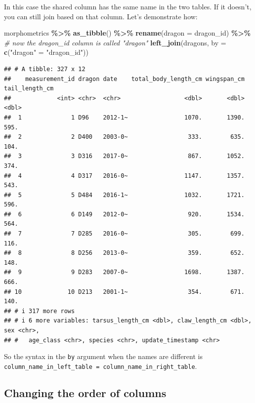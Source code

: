 \documentclass[
]{book}
\newenvironment{Shaded}{\begin{snugshade}}{\end{snugshade}}
\newcommand{\AttributeTok}[1]{\textcolor[rgb]{0.13,0.29,0.53}{#1}}
\newcommand{\CommentTok}[1]{\textcolor[rgb]{0.56,0.35,0.01}{\textit{#1}}}
\newcommand{\FunctionTok}[1]{\textcolor[rgb]{0.13,0.29,0.53}{\textbf{#1}}}
\newcommand{\NormalTok}[1]{#1}
\newcommand{\OtherTok}[1]{\textcolor[rgb]{0.56,0.35,0.01}{#1}}
\newcommand{\SpecialCharTok}[1]{\textcolor[rgb]{0.81,0.36,0.00}{\textbf{#1}}}
\newcommand{\StringTok}[1]{\textcolor[rgb]{0.31,0.60,0.02}{#1}}
\begin{document}
In this case the shared column has the same name in the two tables. If it
doesn't, you can still join based on that column. Let's demonstrate how:

\begin{Shaded}
\begin{Highlighting}[]
\NormalTok{morphometrics }\SpecialCharTok{\%\textgreater{}\%} 
  \FunctionTok{as\_tibble}\NormalTok{() }\SpecialCharTok{\%\textgreater{}\%} 
  \FunctionTok{rename}\NormalTok{(}\AttributeTok{dragon =}\NormalTok{ dragon\_id) }\SpecialCharTok{\%\textgreater{}\%} \CommentTok{\# now the dragon\_id column is called "dragon"}
  \FunctionTok{left\_join}\NormalTok{(dragons, }\AttributeTok{by =} \FunctionTok{c}\NormalTok{(}\StringTok{"dragon"} \OtherTok{=} \StringTok{"dragon\_id"}\NormalTok{)) }
\end{Highlighting}
\end{Shaded}

\begin{verbatim}
## # A tibble: 327 x 12
##    measurement_id dragon date    total_body_length_cm wingspan_cm tail_length_cm
##             <int> <chr>  <chr>                  <dbl>       <dbl>          <dbl>
##  1              1 D96    2012-1~                1070.       1390.           595.
##  2              2 D400   2003-0~                 333.        635.           104.
##  3              3 D316   2017-0~                 867.       1052.           374.
##  4              4 D317   2016-0~                1147.       1357.           543.
##  5              5 D484   2016-1~                1032.       1721.           596.
##  6              6 D149   2012-0~                 920.       1534.           564.
##  7              7 D285   2016-0~                 305.        699.           116.
##  8              8 D256   2013-0~                 359.        652.           148.
##  9              9 D283   2007-0~                1698.       1387.           666.
## 10             10 D213   2001-1~                 354.        671.           140.
## # i 317 more rows
## # i 6 more variables: tarsus_length_cm <dbl>, claw_length_cm <dbl>, sex <chr>,
## #   age_class <chr>, species <chr>, update_timestamp <chr>
\end{verbatim}

So the syntax in the \texttt{by} argument when the names are different is
\texttt{column\_name\_in\_left\_table\ =\ column\_name\_in\_right\_table}.

\hypertarget{changing-the-order-of-columns}{%
\subsection{Changing the order of columns}\label{changing-the-order-of-columns}}
\end{document}
